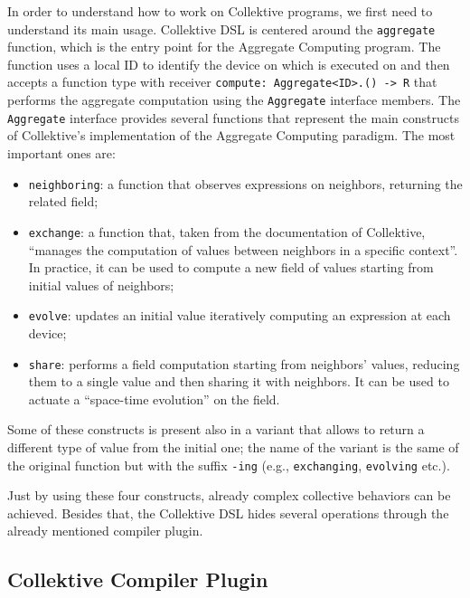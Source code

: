 \documentclass[12pt,a4paper,openright,twoside]{book}
\begin{document}
In order to understand how to work on Collektive programs, we first need to
understand its main usage. Collektive DSL is centered around the
\lstinline{aggregate} function, which is the entry point for the Aggregate
Computing program. The function uses a local ID to identify the device on which
is executed on and then accepts a function type with receiver
\lstinline{compute: Aggregate<ID>.() -> R} that performs the aggregate
computation using the \lstinline{Aggregate} interface members.
%
The \lstinline{Aggregate} interface provides several functions that represent
the main constructs of Collektive's implementation of the Aggregate Computing
paradigm. The most important ones are:
\begin{itemize}
  \item \lstinline{neighboring}: a function that observes expressions on
  neighbors, returning the related field;
  \item \lstinline{exchange}: a function that, taken from the documentation of
  Collektive, ``manages the computation of values between neighbors in a
  specific context''. In practice, it can be used to compute a new field of 
  values starting from initial values of neighbors;
  \item \lstinline{evolve}: updates an initial value iteratively computing an
  expression at each device;
  \item \lstinline{share}: performs a field computation starting from neighbors'
  values, reducing them to a single value and then sharing it with neighbors. 
  It can be used to actuate a ``space-time evolution'' on the field.
\end{itemize}

Some of these constructs is present also in a variant that allows to return a
different type of value from the initial one; the name of the variant is 
the same of the original function but with the suffix \lstinline{-ing} (e.g., 
\lstinline{exchanging}, \lstinline{evolving} etc.).

Just by using these four constructs, already complex collective behaviors can
be achieved. Besides that, the Collektive DSL hides several operations through
the already mentioned compiler plugin. 

\subsection{Collektive Compiler Plugin}
\end{document}
